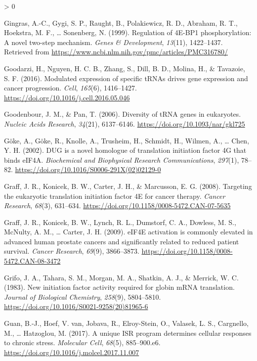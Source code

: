 \documentclass[
  12pt,
  openany]{book}
\newlength{\cslhangindent}
\newenvironment{CSLReferences}[2] %
 {%
  \setlength{\parindent}{0pt}
  \ifodd #1 \everypar{\setlength{\hangindent}{\cslhangindent}}\ignorespaces\fi
  \ifnum #2 > 0
  \setlength{\parskip}{#2\baselineskip}
  \fi
 }%
 {}
\begin{document}
\begin{CSLReferences}{1}{0}
\leavevmode\hypertarget{ref-Gingras1999}{}%
Gingras, A.-C., Gygi, S. P., Raught, B., Polakiewicz, R. D., Abraham, R. T., Hoekstra, M. F., \ldots{} Sonenberg, N. (1999). Regulation of 4E-{BP}1 phosphorylation: A novel two-step mechanism. \emph{Genes \& Development}, \emph{13}(11), 1422--1437. Retrieved from \url{https://www.ncbi.nlm.nih.gov/pmc/articles/PMC316780/}

\leavevmode\hypertarget{ref-Goodarzi2016}{}%
Goodarzi, H., Nguyen, H. C. B., Zhang, S., Dill, B. D., Molina, H., \& Tavazoie, S. F. (2016). Modulated expression of specific {tRNAs} drives gene expression and cancer progression. \emph{Cell}, \emph{165}(6), 1416--1427. \url{https://doi.org/10.1016/j.cell.2016.05.046}

\leavevmode\hypertarget{ref-Goodenbour2006}{}%
Goodenbour, J. M., \& Pan, T. (2006). Diversity of {tRNA} genes in eukaryotes. \emph{Nucleic Acids Research}, \emph{34}(21), 6137--6146. \url{https://doi.org/10.1093/nar/gkl725}

\leavevmode\hypertarget{ref-Goke2002}{}%
Göke, A., Göke, R., Knolle, A., Trusheim, H., Schmidt, H., Wilmen, A., \ldots{} Chen, Y. H. (2002). {DUG} is a novel homologue of translation initiation factor 4G that binds {eIF}4A. \emph{Biochemical and Biophysical Research Communications}, \emph{297}(1), 78--82. \url{https://doi.org/10.1016/S0006-291X(02)02129-0}

\leavevmode\hypertarget{ref-Graff2008}{}%
Graff, J. R., Konicek, B. W., Carter, J. H., \& Marcusson, E. G. (2008). Targeting the eukaryotic translation initiation factor 4E for cancer therapy. \emph{Cancer Research}, \emph{68}(3), 631--634. \url{https://doi.org/10.1158/0008-5472.CAN-07-5635}

\leavevmode\hypertarget{ref-Graff2009}{}%
Graff, J. R., Konicek, B. W., Lynch, R. L., Dumstorf, C. A., Dowless, M. S., McNulty, A. M., \ldots{} Carter, J. H. (2009). {eIF}4E activation is commonly elevated in advanced human prostate cancers and significantly related to reduced patient survival. \emph{Cancer Research}, \emph{69}(9), 3866--3873. \url{https://doi.org/10.1158/0008-5472.CAN-08-3472}

\leavevmode\hypertarget{ref-Grifo1983}{}%
Grifo, J. A., Tahara, S. M., Morgan, M. A., Shatkin, A. J., \& Merrick, W. C. (1983). New initiation factor activity required for globin {mRNA} translation. \emph{Journal of Biological Chemistry}, \emph{258}(9), 5804--5810. \url{https://doi.org/10.1016/S0021-9258(20)81965-6}

\leavevmode\hypertarget{ref-Guan2017}{}%
Guan, B.-J., Hoef, V. van, Jobava, R., Elroy-Stein, O., Valasek, L. S., Cargnello, M., \ldots{} Hatzoglou, M. (2017). A unique {ISR} program determines cellular responses to chronic stress. \emph{Molecular Cell}, \emph{68}(5), 885--900.e6. \url{https://doi.org/10.1016/j.molcel.2017.11.007}


\end{CSLReferences}
\end{document}
